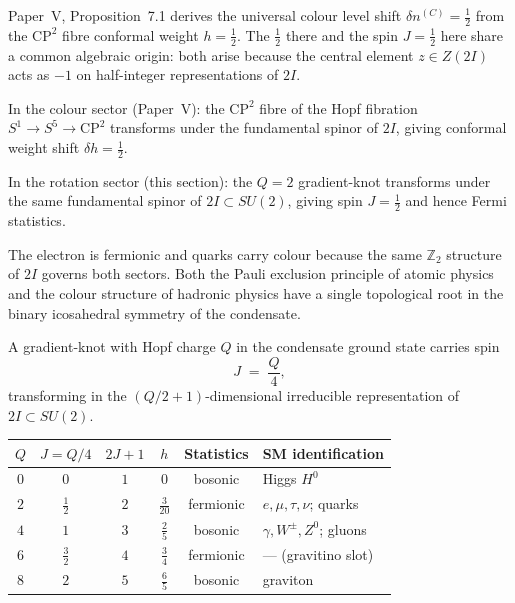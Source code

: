 \begin{remark}[Common origin with the colour level shift $\delta n^{(C)}=\tfrac{1}{2}$]
\label{P13:rem:delta_n_half_origin}
Paper~V, Proposition~7.1 derives the
universal colour level shift $\delta n^{(C)}=\tfrac{1}{2}$ from the
$\mathrm{CP}^2$ fibre conformal weight $h=\tfrac{1}{2}$.
The $\tfrac{1}{2}$ there and the spin $J=\tfrac{1}{2}$ here share a
common algebraic origin: both arise because the central element
$z\in Z(2I)$ acts as $-1$ on half-integer representations of $2I$.

In the colour sector (Paper~V): the $\mathrm{CP}^2$ fibre of the Hopf
fibration $S^1\to S^5\to\mathrm{CP}^2$ transforms under the fundamental
spinor of $2I$, giving conformal weight shift
$\delta h = \tfrac{1}{2}$.

In the rotation sector (this section): the $Q=2$ gradient-knot transforms
under the same fundamental spinor of $2I\subset SU(2)$, giving spin
$J=\tfrac{1}{2}$ and hence Fermi statistics.

The electron is fermionic and quarks carry colour because the same
$\mathbb{Z}_2$ structure of $2I$ governs both sectors.
Both the Pauli exclusion principle of atomic physics and the colour
structure of hadronic physics have a single topological root in the
binary icosahedral symmetry of the condensate.
\end{remark}

\begin{theorem}[Spin from Hopf charge: $J=Q/4$]
\label{P13:thm:spin_tower}
A gradient-knot with Hopf charge $Q$ in the condensate ground state
carries spin
\begin{equation}
  \boxed{J \;=\; \frac{Q}{4},}
  \label{P13:eq:J_Q4}
\end{equation}
transforming in the $(Q/2+1)$-dimensional irreducible representation
of $2I\subset SU(2)$.
\end{theorem}

\begin{center}
\begin{tabular}{cccccl}
\toprule
$Q$ & $J=Q/4$ & $2J+1$ & $h$ & Statistics & SM identification \\
\midrule
$0$ & $0$ & $1$ & $0$    & bosonic  & Higgs $H^0$ \\
$2$ & $\tfrac{1}{2}$ & $2$ & $\tfrac{3}{20}$ & fermionic & $e,\mu,\tau,\nu$; quarks \\
$4$ & $1$ & $3$ & $\tfrac{2}{5}$ & bosonic  & $\gamma,W^\pm,Z^0$; gluons \\
$6$ & $\tfrac{3}{2}$ & $4$ & $\tfrac{3}{4}$ & fermionic & --- (gravitino slot) \\
$8$ & $2$ & $5$ & $\tfrac{6}{5}$ & bosonic  & graviton \\
\bottomrule
\end{tabular}
\end{center}

